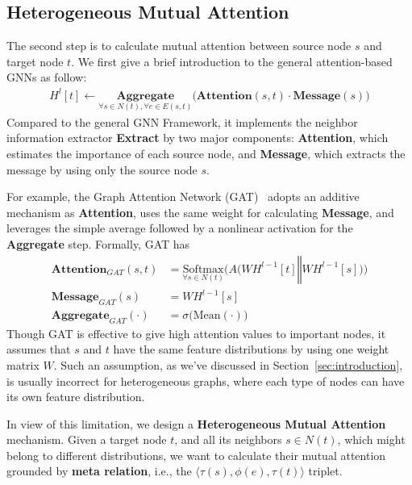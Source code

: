 \documentclass[sigconf]{acmart}
\theoremstyle{definition}
\begin{document}
{\subsection{Heterogeneous Mutual Attention}

The second step is to calculate mutual attention between source node $s$ and target node $t$. We first give a brief introduction to the general attention-based GNNs as follow: 
\begin{align}
H^{l}[t] \gets \underset{\forall s \in N(t), \forall e \in E(s,t)}{\textbf{Aggregate}}\Big(  \textbf{Attention}(s, t) \cdot \textbf{Message}(s)\Big)
\end{align}
Compared to the general GNN Framework, it implements the neighbor information extractor \textbf{Extract} by two major components: \textbf{Attention}, which estimates the importance of each source node, and \textbf{Message}, which extracts the message by using only the source node $s$.

For example, the Graph Attention Network (GAT)~\cite{DBLP:conf/iclr/VelickovicCCRLB18} adopts an additive mechanism as \textbf{Attention}, uses the same weight for calculating \textbf{Message}, and leverages the simple average followed by a nonlinear activation for the \textbf{Aggregate} step. 
Formally, GAT has
\begin{align}
    \textbf{Attention}_{GAT}(s, t) & = \underset{\forall s \in N(t)}{\text{Softmax}} \bigg(A \Big(WH^{l-1}[t] \mathbin\Vert WH^{l-1}[s]\Big)\bigg) \nonumber\\
    \textbf{Message}_{GAT}(s)  & = WH^{l-1}[s] \nonumber\\ 
    \textbf{Aggregate}_{GAT}(\cdot) & = \sigma \Big(\text{Mean}(\cdot)\Big) \nonumber
\end{align}
Though GAT is effective to give high attention values to important nodes, it assumes that $s$ and $t$ have the same feature distributions by using one weight matrix $W$. 
Such an assumption, as we've discussed in Section~\ref{sec:introduction}, 
is usually incorrect for heterogeneous graphs, where each type of nodes can have its own feature distribution. 


In view of this limitation, we design a \textbf{Heterogeneous Mutual Attention} mechanism. 
Given a target node $t$, and all its neighbors $s \in N(t)$, which might belong to different distributions, we want to calculate their mutual attention grounded by \textbf{meta relation}, i.e., the $\langle \tau(s), \phi(e), \tau(t) \rangle$ triplet. 

}
\end{document}
